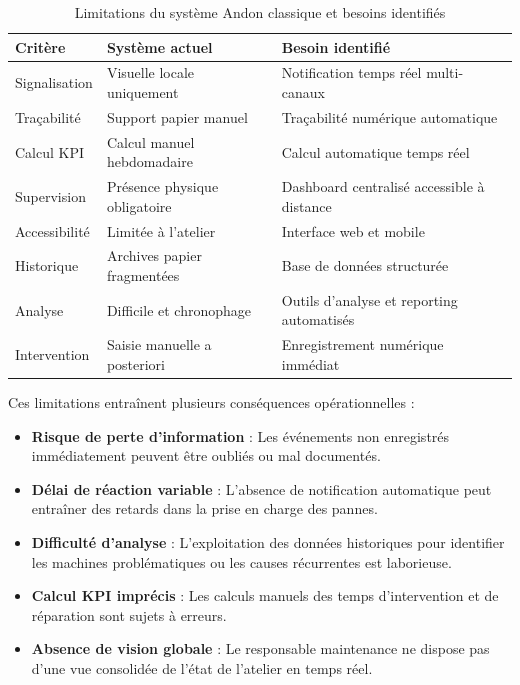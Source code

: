 \begin{table}[htbp]
\centering
\caption{Limitations du système Andon classique et besoins identifiés}
\label{tab:limites_andon}
\small
\begin{tabular}{@{}p{3cm}p{4.5cm}p{5cm}@{}}
\toprule
\textbf{Critère} & \textbf{Système actuel} & \textbf{Besoin identifié} \\
\midrule
\rowcolor{gray!10}
Signalisation & Visuelle locale uniquement & Notification temps réel multi-canaux \\
Traçabilité & Support papier manuel & Traçabilité numérique automatique \\
\rowcolor{gray!10}
Calcul KPI & Calcul manuel hebdomadaire & Calcul automatique temps réel \\
Supervision & Présence physique obligatoire & Dashboard centralisé accessible à distance \\
\rowcolor{gray!10}
Accessibilité & Limitée à l'atelier & Interface web et mobile \\
Historique & Archives papier fragmentées & Base de données structurée \\
\rowcolor{gray!10}
Analyse & Difficile et chronophage & Outils d'analyse et reporting automatisés \\
Intervention & Saisie manuelle a posteriori & Enregistrement numérique immédiat \\
\bottomrule
\end{tabular}
\end{table}

Ces limitations entraînent plusieurs conséquences opérationnelles :

\begin{itemize}
    \item \textbf{Risque de perte d'information} : Les événements non enregistrés immédiatement peuvent être oubliés ou mal documentés.
    \item \textbf{Délai de réaction variable} : L'absence de notification automatique peut entraîner des retards dans la prise en charge des pannes.
    \item \textbf{Difficulté d'analyse} : L'exploitation des données historiques pour identifier les machines problématiques ou les causes récurrentes est laborieuse.
    \item \textbf{Calcul KPI imprécis} : Les calculs manuels des temps d'intervention et de réparation sont sujets à erreurs.
    \item \textbf{Absence de vision globale} : Le responsable maintenance ne dispose pas d'une vue consolidée de l'état de l'atelier en temps réel.
\end{itemize}

